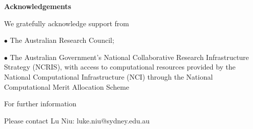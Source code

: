 \documentclass[a0paper,portrait]{baposter}
\begin{document}
\begin{poster}
{\begin{minipage}[t]{0.4\linewidth}
{\begin{tcolorbox}[colback=table_color_2, colframe=table_color_2, rounded corners, boxsep=2pt, left=0pt, right=0pt, top=0pt, bottom=0pt]
        \end{tcolorbox}}
\end{minipage}
\begin{minipage}[t]{0.56\linewidth}
    \begin{center}
        \small\textcolor{dark_blue}{\textbf{Acknowledgements}}
    \end{center}
    \vspace{-15}\footnotesize{
        \begin{tcolorbox}[colback=table_color_2, colframe=table_color_2, rounded corners, boxsep=2pt, left=0pt, right=0pt, top=0pt, bottom=0pt]
            We gratefully acknowledge support from
            \par $\bullet$ The Australian Research Council;
            \par $\bullet$ The Australian Government's National Collaborative Research Infrastructure Strategy (NCRIS),
            with access to computational resources provided by the National Computational Infrastructure (NCI) through the National Computational Merit Allocation Scheme
        \end{tcolorbox}}
    \end{minipage}

\vspace{-10pt}\begin{center}\begin{minipage}[t]{0.6\linewidth}\footnotesize{
\begin{tcolorbox}[colback=color_me, colframe=color_me, rounded corners, boxsep=2pt, left=0pt, right=0pt, top=0pt, bottom=0pt]
    \begin{center}
        For further information
        \par Please contact Lu Niu: luke.niu@sydney.edu.au
    \end{center}
\end{tcolorbox}}
\end{minipage}\end{center}
}

\end{poster}
\end{document}
